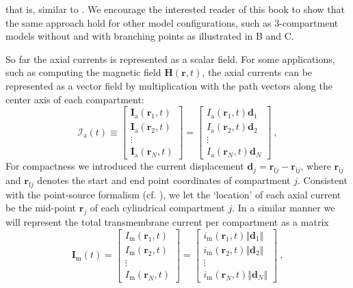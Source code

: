 %
that is, similar to . 
We encourage the interested reader of this book to show that the same approach hold for other model configurations, such 
as 3-compartment models without and with branching points as illustrated in B and C.  

So far the axial currents is represented as a scalar field. 
For some applications, such as computing the magnetic field $\mathbf{H}(\mathbf{r}, t)$, 
the axial currents can be represented as a vector field by multiplication with the path vectors along the center axis of each compartment:
%
\begin{equation}
\mathcal{I}_\mathrm{a}(t) \equiv
\begin{bmatrix}
\mathbf{I}_\mathrm{a}(\mathbf{r}_1, t)\\
\mathbf{I}_\mathrm{a}(\mathbf{r}_2, t)\\
\vdots \\
\mathbf{I}_\mathrm{a}(\mathbf{r}_N, t)
\end{bmatrix}
=
\begin{bmatrix}
I_\mathrm{a}(\mathbf{r}_1, t) \mathbf{d}_1 \\
I_\mathrm{a}(\mathbf{r}_2, t) \mathbf{d}_2 \\
\vdots \\
I_\mathrm{a}(\mathbf{r}_N, t) \mathbf{d}_N
\end{bmatrix} ~,
\end{equation}
%
For compactness we introduced the current displacement $\mathbf{d}_j=\mathbf{r}_{\mathrm{f}j} - \mathbf{r}_{\mathrm{i}j}$, 
where $\mathbf{r}_{\mathrm{i}j}$ and $\mathbf{r}_{\mathrm{f}j}$ denotes the start and end point coordinates of compartment $j$. 
Consistent with the point-source formalism (cf. ), 
we let the `location' of each axial current be the mid-point $\mathbf{r}_j$ of each cylindrical compartment $j$. 
In a similar manner we will represent the total transmembrane current per compartment as a matrix
\begin{equation}
\mathbf{I}_\mathrm{m}(t) = 
\begin{bmatrix}
I_\mathrm{m}(\mathbf{r}_1, t) \\
I_\mathrm{m}(\mathbf{r}_2, t) \\
\vdots \\
I_\mathrm{m}(\mathbf{r}_N, t)
\end{bmatrix}
=
\begin{bmatrix}
i_\mathrm{m}(\mathbf{r}_1, t) \Vert \mathbf{d}_1 \Vert \\
i_\mathrm{m}(\mathbf{r}_2, t) \Vert \mathbf{d}_2 \Vert \\
\vdots \\
i_\mathrm{m}(\mathbf{r}_N, t) \Vert \mathbf{d}_N \Vert
\end{bmatrix} ~,
\end{equation}
